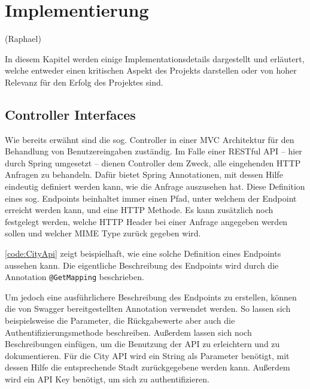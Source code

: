 \chapter{Implementierung}\label{sec:implementierung}

	(Raphael)

	In diesem Kapitel werden einige Implementationsdetails dargestellt und erläutert, welche entweder einen kritischen Aspekt des Projekts darstellen oder von hoher Relevanz für den Erfolg des Projektes sind. 
	
	\section{Controller Interfaces}
	
		Wie bereits erwähnt sind die sog. Controller in einer \acs{MVC} Architektur für den Behandlung von Benutzereingaben zuständig. Im Falle einer \acs{REST}ful \acs{API} -- hier durch Spring umgesetzt -- dienen Controller dem Zweck, alle eingehenden \acs{HTTP} Anfragen zu behandeln. Dafür bietet Spring Annotationen, mit dessen Hilfe eindeutig definiert werden kann, wie die Anfrage auszusehen hat. Diese Definition eines sog. Endpoints beinhaltet immer einen Pfad, unter welchem der Endpoint erreicht werden kann, und eine \acs{HTTP} Methode. Es kann zusätzlich noch festgelegt werden, welche \acs{HTTP} Header bei einer Anfrage angegeben werden sollen und welcher \acs{MIME} Type zurück gegeben wird.
		
		\autoref{code:CityApi} zeigt beispielhaft, wie eine solche Definition eines Endpoints aussehen kann. Die eigentliche Beschreibung des Endpoints wird durch die Annotation \lstinline|@GetMapping| beschrieben. 	
		
		Um jedoch eine ausführlichere Beschreibung des Endpoints zu erstellen, können die von Swagger bereitgestellten Annotation verwendet werden. So lassen sich beispielsweise die Parameter, die Rückgabewerte aber auch die Authentifizierungsmethode beschreiben. Außerdem lassen sich noch Beschreibungen einfügen, um die Benutzung der \acs{API} zu erleichtern und zu dokumentieren. Für die City \acs{API} wird ein String als Parameter benötigt, mit dessen Hilfe die entsprechende Stadt zurückgegebene werden kann. Außerdem wird ein \acs{API} Key benötigt, um sich zu authentifizieren. 
		
		
		
